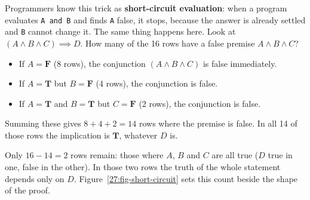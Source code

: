 Programmers know this trick as \textbf{short-circuit evaluation}: when a program evaluates \texttt{A and B} and finds \texttt{A} false, it stops, because the answer is already settled and \texttt{B} cannot change it. The same thing happens here. Look at $(A \land B \land C) \implies D$. How many of the 16 rows have a false premise $A \land B \land C$?
\begin{itemize}
\item If $A = \mathbf{F}$ (8 rows), the conjunction $(A \land B \land C)$ is false immediately.
\item If $A = \mathbf{T}$ but $B = \mathbf{F}$ (4 rows), the conjunction is false.
\item If $A = \mathbf{T}$ and $B = \mathbf{T}$ but $C = \mathbf{F}$ (2 rows), the conjunction is false.
\end{itemize}
Summing these gives $8 + 4 + 2 = 14$ rows where the premise is false. In all 14 of those rows the implication is $\mathbf{T}$, whatever $D$ is.

Only $16 - 14 = 2$ rows remain: those where $A$, $B$ and $C$ are all true ($D$ true in one, false in the other). In those two rows the truth of the whole statement depends only on $D$. Figure~\ref{27:fig-short-circuit} sets this count beside the shape of the proof.

